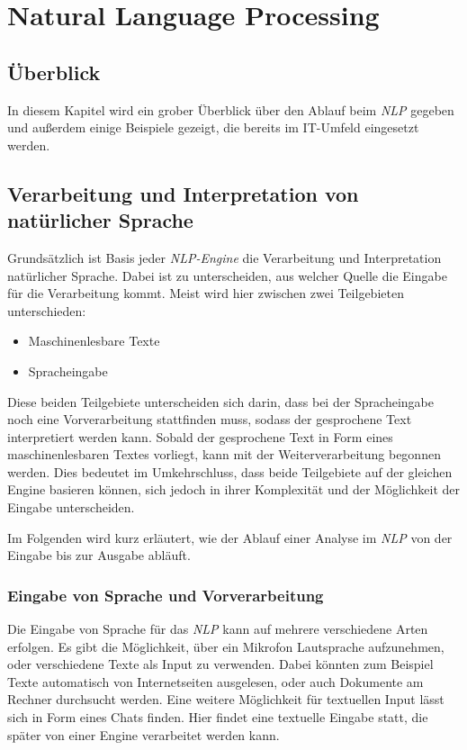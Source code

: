\chapter{Natural Language Processing}
\label{cha:NaturalLanguageProcessing}
\section{Überblick}
In diesem Kapitel wird ein grober Überblick über den Ablauf beim \textit{NLP} gegeben und außerdem einige Beispiele gezeigt, die bereits im IT-Umfeld eingesetzt werden. 

\section{Verarbeitung und Interpretation von natürlicher Sprache}
\label{sec:applications-natural-language-processing}
Grundsätzlich ist Basis jeder \textit{NLP-Engine} die Verarbeitung und Interpretation natürlicher Sprache. Dabei ist zu unterscheiden, aus welcher Quelle die Eingabe für die Verarbeitung kommt. Meist wird hier zwischen zwei Teilgebieten unterschieden:

\begin{itemize}
	\item Maschinenlesbare Texte
	\item Spracheingabe
\end{itemize}

Diese beiden Teilgebiete unterscheiden sich darin, dass bei der Spracheingabe noch eine Vorverarbeitung stattfinden muss, sodass der gesprochene Text interpretiert werden kann. Sobald der gesprochene Text in Form eines maschinenlesbaren Textes vorliegt, kann mit der Weiterverarbeitung begonnen werden. Dies bedeutet im Umkehrschluss, dass beide Teilgebiete auf der gleichen Engine basieren können, sich jedoch in ihrer Komplexität und der Möglichkeit der Eingabe unterscheiden. 

Im Folgenden wird kurz erläutert, wie der Ablauf einer Analyse im \textit{NLP} von der Eingabe bis zur Ausgabe abläuft. 

\subsection{Eingabe von Sprache und Vorverarbeitung}
Die Eingabe von Sprache für das \textit{NLP} kann auf mehrere verschiedene Arten erfolgen. Es gibt die Möglichkeit, über ein Mikrofon Lautsprache aufzunehmen, oder verschiedene Texte als Input zu verwenden. Dabei könnten zum Beispiel Texte automatisch von Internetseiten ausgelesen, oder auch Dokumente am Rechner durchsucht werden. Eine weitere Möglichkeit für textuellen Input lässt sich in Form eines Chats finden. Hier findet eine textuelle Eingabe statt, die später von einer Engine verarbeitet werden kann. 

